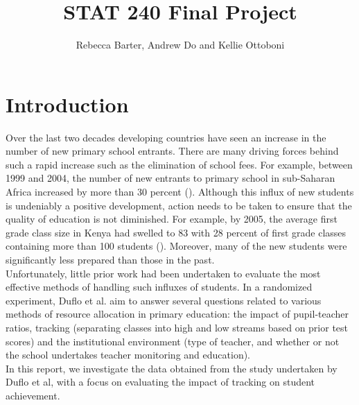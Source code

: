 \documentclass[11pt]{article}
\title{STAT 240 Final Project}
\author{Rebecca Barter, Andrew Do and Kellie Ottoboni}
\begin{document}
\maketitle

 \section{Introduction}
Over the last two decades developing countries have seen an increase in the number of new primary school entrants. There are many driving forces behind such a rapid increase such as the elimination of school fees. For example, between 1999 and 2004, the number of new entrants to primary school in sub-Saharan Africa increased by more than 30 percent (\cite{unesco2007}). Although this influx of new students is undeniably a positive development, action needs to be taken to ensure that the quality of education is not diminished. For example, by 2005, the average first grade class size in Kenya had swelled to 83 with 28 percent of first grade classes containing more than 100 students (\cite{duflo2007}). Moreover, many of the new students were significantly less prepared than those in the past.\\
Unfortunately, little prior work had been undertaken to evaluate the most effective methods of handling such influxes of students. In a randomized experiment, Duflo et al. aim to answer several questions related to various methods of resource allocation in primary education: the impact of pupil-teacher ratios, tracking (separating classes into high and low streams based on prior test scores) and the institutional environment (type of teacher, and whether or not the school undertakes teacher monitoring and education).\\
 In this report, we investigate the data obtained from the study undertaken by Duflo et al, with a focus on evaluating the impact of tracking on student achievement. 
 
\end{document}
